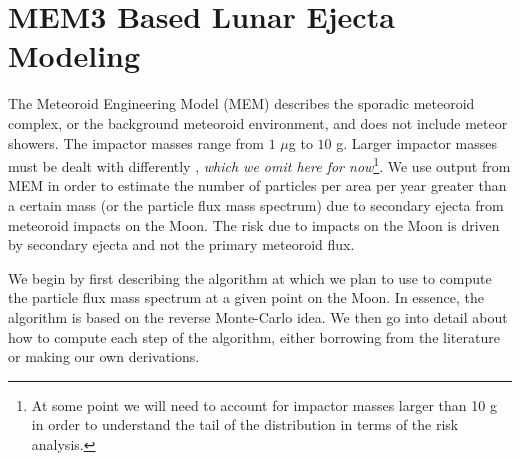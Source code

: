 \documentclass{hitec}
\begin{document}
\section{MEM3 Based Lunar Ejecta Modeling}
\label{sec:MEM3 Based Lunar Ejecta Modeling}
The \textsf{Meteoroid Engineering Model} (MEM) describes the sporadic meteoroid complex, or the background meteoroid environment, and does not include meteor showers. The impactor masses range from $1$ $\mu$g to $10$ g. Larger impactor masses must be dealt with differently \citep[e.g., see][]{neukum2001cratering, brown2002flux},\textit{ which we omit here for now}\footnote{At some point we will need to account for impactor masses larger than 10 g in order to understand the tail of the distribution in terms of the risk analysis.}. We use output from MEM in order to estimate the number of particles per area per year greater than a certain mass (or the particle flux mass spectrum) due to secondary ejecta from meteoroid impacts on the Moon. The risk due to impacts on the Moon is driven by secondary ejecta and not the primary meteoroid flux.

We begin by first describing the algorithm at which we plan to use to compute the particle flux mass spectrum at a given point on the Moon. In essence, the algorithm is based on the reverse Monte-Carlo idea. We then go into detail about how to compute each step of the algorithm, either borrowing from the literature or making our own derivations.
\end{document}
